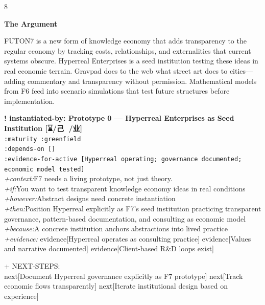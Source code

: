 \documentclass[landscape]{article}
\newcommand{\flexitag}[1]{\textcolor[gray]{0.35}{\textit{#1}}}
\newenvironment{devmapgreenfield}{%
  \def\FrameCommand{\colorbox{devmapgreenfieldbg}}%
  \setlength{\fboxsep}{2pt}%
  \MakeFramed{\advance\hsize-\width \FrameRestore}%
}{\endMakeFramed}
\begin{document}
\begin{paracol}{8}
\par
\textbf{The Argument}\par
\par
FUTON7 is a new form of knowledge economy that adds transparency to the regular economy by tracking costs, relationships, and externalities that current systems obscure. Hyperreal Enterprises is a seed institution testing these ideas in real economic terrain. Gravpad does to the web what street art does to cities—adding commentary and transparency without permission. Mathematical models from F6 feed into scenario simulations that test future structures before implementation.\\
\par
\par
\begin{devmapgreenfield}
\textbf{! instantiated-by: Prototype 0 — Hyperreal Enterprises as Seed Institution [⌛️/己 💫/业]}\\
  \texttt{:\allowbreak{}maturity :\allowbreak{}greenfield}\\
  \texttt{:\allowbreak{}depends-\allowbreak{}on []}\\
  \texttt{:\allowbreak{}evidence-\allowbreak{}for-\allowbreak{}active [Hyperreal operating;\allowbreak{} governance documented;\allowbreak{} economic model tested]}\\
  \flexitag{+context:}F7 needs a living prototype, not just theory.\\
  \flexitag{+if:}You want to test transparent knowledge economy ideas in real conditions\\
  \flexitag{+however:}Abstract designs need concrete instantiation\\
  \flexitag{+then:}Position Hyperreal explicitly as F7’s seed institution practicing transparent governance, pattern-based documentation, and consulting as economic model\\
  \flexitag{+because:}A concrete institution anchors abstractions into lived practice\\
  \flexitag{+evidence:} evidence[Hyperreal operates as consulting practice] evidence[Values and narrative documented] evidence[Client-based R\&D loops exist]\\
\par
  + NEXT-STEPS:\\
    next[Document Hyperreal governance explicitly as F7 prototype] next[Track economic flows transparently] next[Iterate institutional design based on experience]\\
\par

\end{devmapgreenfield}
\end{paracol}
\end{document}
